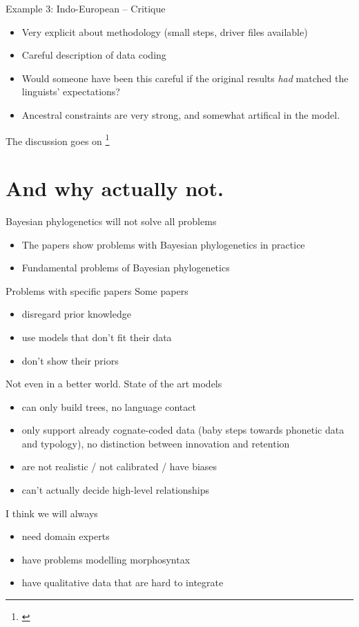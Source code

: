 \documentclass[9pt]{beamer}
\begin{document}
\begin{frame}{Example 3: Indo-European – Critique}
  \begin{itemize}
  \item Very explicit about methodology (small steps, driver files available)
  \item Careful description of data coding
  \item Would someone have been this careful if the original results \emph{had}
    matched the linguists' expectations?
  \item Ancestral constraints are very strong, and somewhat artifical in the
    model.
  \end{itemize}
  The discussion goes on \footnote{\textcite{verkerk2017phylogenies}}
\end{frame}
\section{And why actually not.}
\begin{frame}{Bayesian phylogenetics will not solve all problems}
  \begin{itemize}
  \item The papers show problems with Bayesian phylogenetics in practice
    \pause
  \item Fundamental problems of Bayesian phylogenetics
  \end{itemize}
\end{frame}
\begin{frame}{Problems with specific papers}
  Some papers
  \begin{itemize}
  \item disregard prior knowledge
  \item use models that don't fit their data
  \item don't show their priors
  \end{itemize}
\end{frame}
\begin{frame}{Not even in a better world.}
  State of the art models
  \begin{itemize}
  \item can only build trees, no language contact
    \pause
  \item only support already cognate-coded data (baby steps towards phonetic data and typology),
    \pause no distinction between innovation and retention
    \pause
  \item are not realistic / not calibrated / have biases
    \pause
  \item can't actually decide high-level relationships
  \end{itemize}
  \pause
  I think we will always
  \begin{itemize}
  \item need domain experts
  \item have problems modelling morphosyntax
  \item have qualitative data that are hard to integrate
  \end{itemize}
\end{frame}
\end{document}
